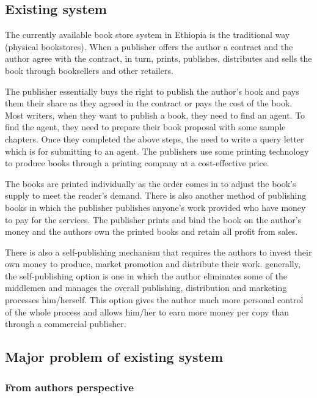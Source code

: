 	\subsection{Existing system}

The currently available book store system in Ethiopia is the traditional way (physical bookstores). When a publisher offers the author a contract and the author agree with the contract, in turn, prints, publishes, distributes and sells the book through booksellers and other retailers.

The publisher essentially buys the right to publish the author's book and pays them their share as they agreed in the contract or pays the cost of the book. Most writers, when they want to publish a book, they need to find an agent. To find the agent, they need to prepare their book proposal with some sample chapters. Once they completed the above steps, the need to write a query letter which is for submitting to an agent. The publishers use some printing technology to produce books through a printing company at a cost-effective price.

The books are printed individually as the order comes in to adjust the book's supply to meet the reader's demand.  There is also another method of publishing books in which the publisher publishes anyone’s work provided who have money to pay for the services. The publisher prints and bind the book on the author's money and the authors own the printed books and retain all profit from sales.

There is also a self-publishing mechanism that requires the authors to invest their own money to produce, market promotion and distribute their work. generally, the self-publishing option is one in which the author eliminates some of the middlemen and manages the overall publishing, distribution and marketing processes him/herself. This option gives the author much more personal control of the whole process and allows him/her to earn more money per copy than through a commercial publisher.

	\subsection{Major problem of existing system}
		\subsubsection{From authors perspective}

